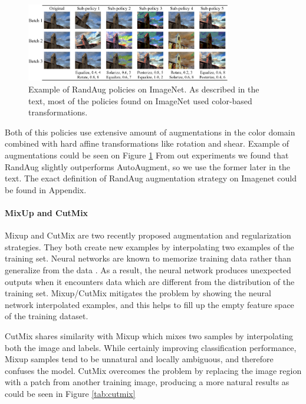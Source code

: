 \begin{figure}[ht!]
    \centering
    \includegraphics[width=0.8\textwidth]{images/randaug_policy.png}
    \caption{Example of RandAug policies on ImageNet. As described in the text, most of the policies found on ImageNet used color-based transformations.}
    \label{fig:randaug}
  \end{figure}

Both of this policies use extensive amount of augmentations in the color domain combined with hard affine transformations like rotation and shear. Example of augmentations could be seen on Figure \ref{fig:randaug}
From out experiments we found that RandAug slightly outperforms AutoAugment, so we use the former later in the text. The exact definition of RandAug augmentation strategy on Imagenet could be found in Appendix. 


\paragraph{MixUp and CutMix}


Mixup \cite{zhang2017_mixup} and CutMix \cite{yun2019_cutmix} are two recently proposed augmentation and regularization strategies. They both create new examples by interpolating two examples of the training set. Neural networks are known to memorize training data rather than generalize from the data \cite{zhang2016_understanding_deep}. As a result, the neural network produces unexpected outputs when it encounters data which are different from the distribution of the training set. Mixup/CutMix mitigates the problem by showing the neural network interpolated examples, and this helps to fill up the empty feature space of the training dataset.



CutMix shares similarity with Mixup which mixes two samples by interpolating both the image and labels. While certainly improving classification performance, Mixup samples tend to be unnatural and locally ambiguous, and therefore confuses the model. CutMix overcomes the problem by replacing the image region with a patch from another training image, producing a more natural results as could be seen in Figure \ref{tab:cutmix}

